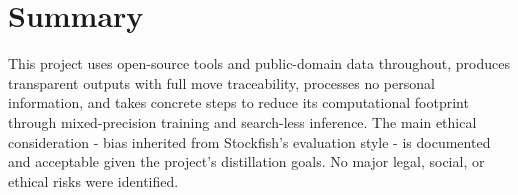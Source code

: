 \section{Summary}
This project uses open-source tools and public-domain data throughout, produces transparent outputs with full move traceability, processes no personal information, and takes concrete steps to reduce its computational footprint through mixed-precision training and search-less inference. The main ethical consideration - bias inherited from Stockfish's evaluation style - is documented and acceptable given the project's distillation goals. No major legal, social, or ethical risks were identified.
